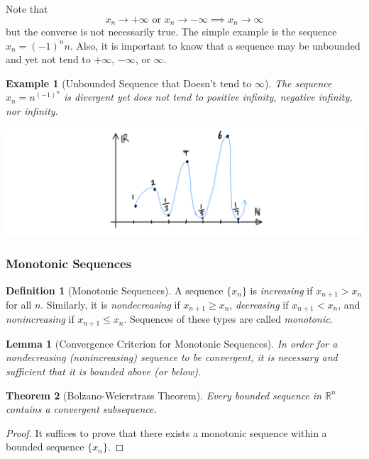 \documentclass{article}
\newtheorem{theorem}{Theorem}[section]
\newtheorem{lemma}[theorem]{Lemma}
\newtheorem{example}{Example}[section]
\theoremstyle{remark}
\theoremstyle{definition}
\newtheorem{definition}{Definition}[section]
\begin{document}
Note that 
\[x_n \rightarrow +\infty \text{ or } x_n \rightarrow -\infty \implies x_n \rightarrow \infty\]
but the converse is not necessarily true. The simple example is the sequence $x_n = (-1)^n n$. Also, it is important to know that a sequence may be unbounded and yet not tend to $+\infty$, $-\infty$, or $\infty$. 

\begin{example}[Unbounded Sequence that Doesn't tend to $\infty$]
The sequence $x_n = n^{(-1)^n}$ is divergent yet does not tend to positive infinity, negative infinity, nor infinity. 
\begin{center}
    \includegraphics[scale=0.3]{img/Neither_Divergent_Sequence.PNG}
\end{center}
\end{example}

\subsubsection{Monotonic Sequences}

\begin{definition}[Monotonic Sequences]
A sequence $\{x_n\}$ is \textit{increasing} if $x_{n+1} > x_n$ for all $n$. Similarly, it is \textit{nondecreasing} if $x_{n+1} \geq x_n$, \textit{decreasing} if $x_{n+1} < x_n$, and \textit{nonincreasing} if $x_{n+1} \leq x_n$. Sequences of these types are called \textit{monotonic}. 
\end{definition}


\begin{lemma}[Convergence Criterion for Monotonic Sequences]
In order for a nondecreasing (nonincreasing) sequence to be convergent, it is necessary and sufficient that it is bounded above (or below). 
\end{lemma}

\begin{theorem}[Bolzano-Weierstrass Theorem]
Every bounded sequence in $\mathbb{R}^n$ contains a convergent subsequence. 
\end{theorem} 
\begin{proof}
It suffices to prove that there exists a monotonic sequence within a bounded sequence $\{x_n\}$. 
\end{proof}
\end{document}
